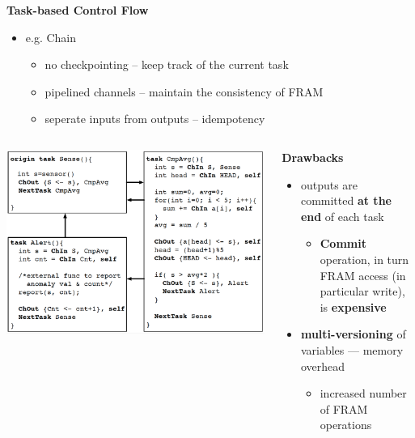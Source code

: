 
\begin{frame}{\textbf{Task-based Control Flow}}
	
	\begin{itemize}
		\item e.g. Chain\cite{colin2016chain} 
		\begin{itemize}
			\item no checkpointing -- keep track of the current task 
			\item pipelined channels -- maintain the consistency of 
			FRAM
			\item seperate inputs from outputs -- idempotency
		\end{itemize}
		
	\end{itemize}
	
	\begin{columns}		
		
		\centering
		\includegraphics[scale=0.10]{images/chain.png}\\
		
		\begin{block}{\textbf{Drawbacks}}
			\begin{itemize}
				\item outputs are committed \textbf{at the end} of each task
				\begin{itemize}
					\item \textbf{Commit} operation, in turn FRAM access (in particular write), is \textbf{expensive}
				\end{itemize}
				\item \textbf{multi-versioning} of variables --- memory overhead
				\begin{itemize}	
					\item increased number of FRAM operations
				\end{itemize}
			\end{itemize}	
		\end{block}
		
	\end{columns}
	
\end{frame}



